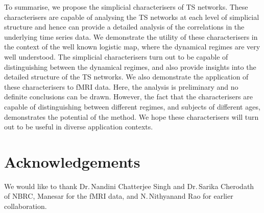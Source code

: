 \documentclass[aps,pre,superscriptaddress,groupedaddress,preprint]{revtex4}  %
\begin{document}
To summarise, we propose the simplicial characterisers of TS networks. These characterisers are capable of analysing the TS networks at each level of simplicial structure and hence can provide a detailed analysis of the correlations in the underlying time series data. We demonstrate the utility of these characterisers in the context of the well known logistic map, where the dynamical regimes are very well understood. The simplicial characterisers turn out to be capable of distinguishing between the dynamical regimes, and also provide insights into the detailed structure of the TS networks. We also demonstrate the application of these characterisers to fMRI data. Here, the analysis is preliminary and no definite conclusions can be drawn. However, the fact that the characterisers are capable of distinguishing between different regimes, and subjects of different ages, demonstrates the potential of the method. We hope these characterisers will turn out to be useful in diverse application contexts.  


% 
\section{Acknowledgements}
We would like to thank Dr.\,Nandini Chatterjee Singh and Dr.\,Sarika Cherodath of NBRC, Manesar for the fMRI data, and N.\,Nithyanand Rao for earlier collaboration.

% 
%
%


\end{document}
